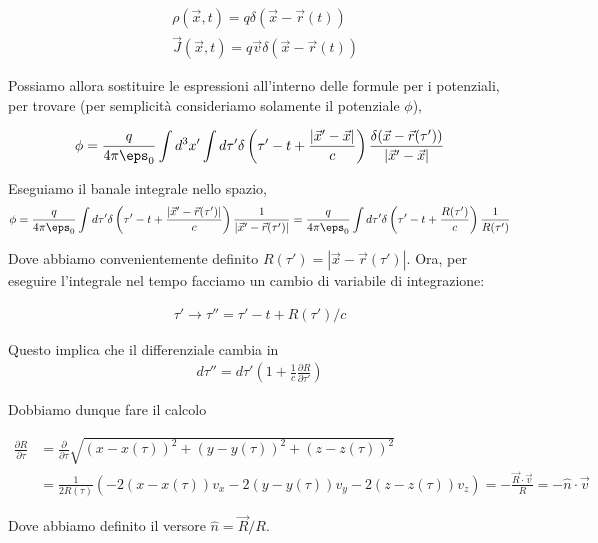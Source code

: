\documentclass{report}
\begin{document}
\begin{align}
    &\rho(\vec{x}, t) = q\delta(\vec{x}-\vec{r}(t)) \\
    &\vec{J}(\vec{x}, t) = q\vec{v}\delta(\vec{x}-\vec{r}(t))
\end{align}

Possiamo allora sostituire le espressioni all'interno delle formule per i potenziali, per trovare (per semplicità consideriamo solamente il potenziale \(\phi\)), 

\begin{align}
    \phi = \frac{q}{4\pi \eps_0}\int d^3x' \int d\tau' \delta\left(\tau' - t + \frac{|\vec{x}' -\vec{x}|}{c}\right)\frac{\delta(\vec{x}-\vec{r}(\tau'))}{|\vec{x}'-\vec{x}|}
\end{align}

Eseguiamo il banale integrale nello spazio, 
\begin{align}
    \phi = \frac{q}{4\pi \eps_0} \int d\tau' \delta\left(\tau' - t + \frac{|\vec{x}' -\vec{r}(\tau')|}{c}\right)\frac{1}{|\vec{x}'-\vec{r}(\tau')|} = \frac{q}{4\pi \eps_0} \int d\tau' \delta\left(\tau' - t + \frac{R(\tau')}{c}\right)\frac{1}{R(\tau')}
\end{align}

Dove abbiamo convenientemente definito \(R(\tau') = |\vec{x}-\vec{r}(\tau')|\). 
Ora, per eseguire l'integrale nel tempo facciamo un cambio di variabile di integrazione: 

\begin{align}
    \tau' \rightarrow \tau'' = \tau' - t + R(\tau')/c 
\end{align}

Questo implica che il differenziale cambia in 
\begin{align}
    d\tau'' = d\tau'\left(1 +\frac{1}{c}\frac{\partial R}{\partial \tau'}\right)
\end{align}

Dobbiamo dunque fare il calcolo 

\begin{align}
    \frac{\partial R}{\partial \tau} &= \frac{\partial}{\partial \tau}\sqrt{(x-x(\tau))^2 +(y-y(\tau))^2 + (z-z(\tau))^2} \\
    &= \frac{1}{2R(\tau)}(-2(x-x(\tau))v_x -2(y-y(\tau))v_y - 2(z-z(\tau))v_z) = -\frac{\vec{R}\cdot \vec{v}}{R} = -\hat{n}\cdot \vec{v}
\end{align}

Dove abbiamo definito il versore \(\hat{n} = \vec{R}/R\). \\
\end{document}
